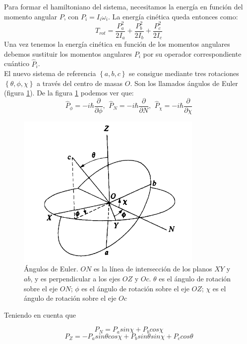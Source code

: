 \documentclass[a4paper]{article}
\begin{document}
Para formar el hamiltoniano del sistema, necesitamos la energía en función del momento angular $P$, con $P_i=I_i\omega_i$.
La energía cinética queda entonces como:
\begin{equation}
T_{rot}=\frac{P_a^2}{2I_a}+\frac{P_b^2}{2I_b}+\frac{P_c^2}{2I_c}
\end{equation}
Una vez tenemos la energía cinética en función de los momentos angulares debemos sustituir los momentos angulares $P_i$ por su operador correspondiente cuántico $\hat P_i$.\\

El nuevo sistema de referencia $\left\lbrace a,b,c \right\rbrace$ se consigue mediante tres rotaciones  $\left\lbrace \theta,\phi,\chi \right\rbrace$ a través del centro de masas $O$. Son los llamados ángulos de Euler (figura \ref{euler}).
De la figura \ref{euler} podemos ver que:
\begin{equation}
\hat P_{\phi}=-i\hbar\frac{\partial}{\partial \phi},\,\ \hat P_{N}=-i\hbar\frac{\partial}{\partial N},\,\ \hat P_{\chi}=-i\hbar\frac{\partial}{\partial \chi}
\end{equation}

\begin{figure}
\includegraphics[width=0.8\textwidth]{Angulos_Euler.png}
\caption{Ángulos de Euler. $ON$ es la línea de intersección de los planos $XY$ y $ab$, y es perpendicular a los ejes $OZ$ y $Oc$. $\theta$ es el ángulo de rotación sobre el eje $ON$; $\phi$ es el ángulo de rotación sobre el eje $OZ$; $\chi$ es el ángulo de rotación sobre el eje $Oc$ }
\label{euler}
\end{figure}

Teniendo en cuenta que 

$$ P_N=  P_a sin\chi + P_b cos\chi$$  
$$ P_Z= -P_a sin\theta cos\chi + P_b sin\theta sin\chi + P_c cos\theta $$
\end{document}

